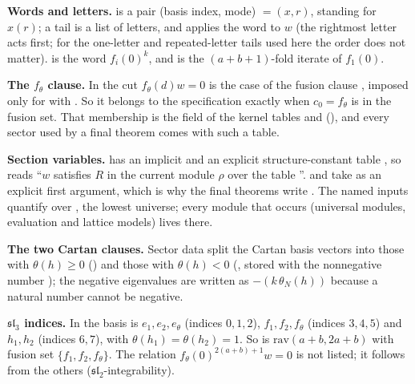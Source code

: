 \begin{dictionary}
\textbf{Words and letters.}  is a pair (basis index, mode) $=(x,r)$, standing for $x(r)$; a tail is a list of
letters, and  applies the word to $w$ (the rightmost letter acts first; for the one-letter and
repeated-letter tails used here the order does not matter).  is the word $f_i(0)^k$, and
 is the $(a+b+1)$-fold iterate of $f_1(0)$.

\textbf{The $f_\theta$ clause.} In  the cut $f_\theta(d)w=0$ is the case  of the fusion clause
\lean{[(x, if x = S.c₀ then d else k)]}, imposed only for  with . So it belongs to the specification
exactly when $c_0=f_\theta$ is in the fusion set. That membership is the field  of the kernel
tables  and  (), and every sector
used by a final theorem comes with such a table.

\textbf{Section variables.}  has an implicit  and an explicit structure-constant table
, so  reads ``$w$ satisfies $R$ in the current module $\rho$ over the
table ''.  and  take  as an explicit first argument, which is why the final
theorems write . The named inputs quantify over , the lowest universe; every module
that occurs (universal modules, evaluation and lattice models) lives there.

\textbf{The two Cartan clauses.} Sector data split the Cartan basis vectors into those with $\theta(h)\ge0$
() and those with $\theta(h)<0$ (, stored with the nonnegative number ); the
negative eigenvalues are written as $-(k\,\theta_N(h))$ because a natural number cannot be negative.

\textbf{$\mathfrak{sl}_3$ indices.} In  the basis is $e_1,e_2,e_\theta$ (indices $0,1,2$), $f_1,f_2,f_\theta$
(indices $3,4,5$) and $h_1,h_2$ (indices $6,7$), with $\theta(h_1)=\theta(h_2)=1$. So  is
$\mathrm{rav}(a+b,2a+b)$ with fusion set $\{f_1,f_2,f_\theta\}$. The relation $f_\theta(0)^{2(a+b)+1}w=0$ is not listed; it follows
from the others ($\mathfrak{sl}_2$-integrability).


\end{dictionary}
